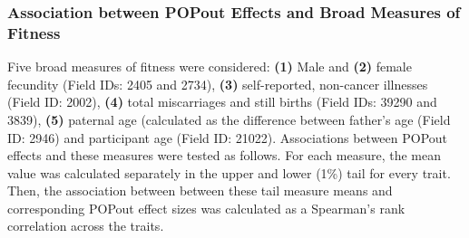 \documentclass[12pt]{zHenriquesLab-StyleBioRxiv}
\begin{document}
{{{\subsubsection*{Association between POPout Effects and Broad Measures of Fitness}
Five broad measures of fitness were considered: \textbf{(1)} Male and \textbf{(2)} female 
fecundity (Field IDs: 2405 and 2734), \textbf{(3)} self-reported, non-cancer illnesses 
(Field ID: 2002), \textbf{(4)} total miscarriages and still births (Field IDs: 39290 and 3839), 
\textbf{(5)} paternal age (calculated as the difference between father's age (Field ID: 2946) 
and participant age (Field ID: 21022). Associations between POPout effects and these 
measures were tested as follows. For each measure, the mean value was calculated 
separately in the upper and lower (1\%) tail for every trait. Then, the association between 
between these tail measure means and corresponding POPout effect sizes was 
calculated as a Spearman's rank correlation across the traits.




































\clearpage \newpage 






















































}}}
\end{document}
